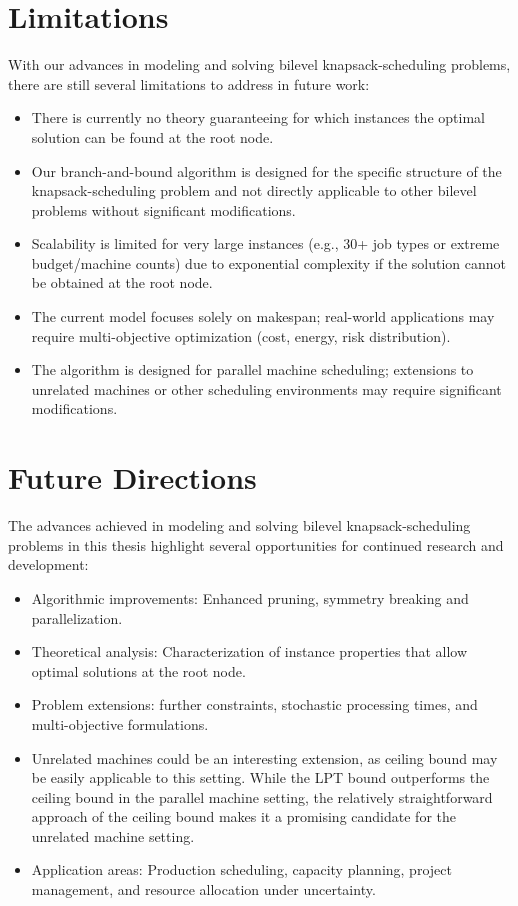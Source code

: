 \section{Limitations}
With our advances in modeling and solving bilevel knapsack-scheduling problems, there are still several limitations to address in future work:
\begin{itemize}
    \item There is currently no theory guaranteeing for which instances the optimal solution can be found at the root node.
    \item Our branch-and-bound algorithm is designed for the specific structure of the knapsack-scheduling problem and not directly applicable to other bilevel problems without significant modifications.
    \item Scalability is limited for very large instances (e.g., 30+ job types or extreme budget/machine counts) due to exponential complexity if the solution cannot be obtained at the root node.
    \item The current model focuses solely on makespan; real-world applications may require multi-objective optimization (cost, energy, risk distribution).
    \item The algorithm is designed for parallel machine scheduling; extensions to unrelated machines or other scheduling environments may require significant modifications.
\end{itemize}

\section{Future Directions}

The advances achieved in modeling and solving bilevel knapsack-scheduling problems in this thesis highlight several opportunities for continued research and development:
\begin{itemize}
    \item Algorithmic improvements: Enhanced pruning, symmetry breaking and parallelization.
    \item Theoretical analysis: Characterization of instance properties that allow optimal solutions at the root node.
    \item Problem extensions: further constraints, stochastic processing times, and multi-objective formulations.
    \item Unrelated machines could be an interesting extension, as ceiling bound may be easily applicable to this setting. While the LPT bound outperforms the ceiling bound in the parallel machine setting, the relatively straightforward approach of the ceiling bound makes it a promising candidate for the unrelated machine setting.
    \item Application areas: Production scheduling, capacity planning, project management, and resource allocation under uncertainty.
\end{itemize}


